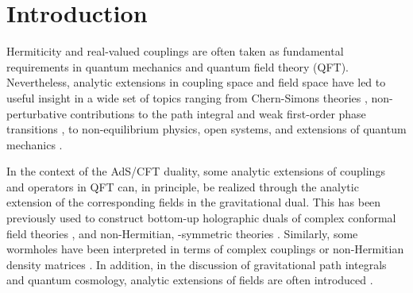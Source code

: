 \section{Introduction}

Hermiticity and real-valued couplings are often taken as fundamental requirements in quantum mechanics and quantum field theory (QFT). 
Nevertheless, analytic extensions in coupling space and field space have led to useful insight in a wide set of topics ranging from Chern-Simons theories \cite{Witten:2010cx}, non-perturbative contributions to the path integral \cite{Basar:2013eka} and weak first-order phase transitions \cite{Gorbenko:2018dtm,Gorbenko:2018ncu}, to non-equilibrium physics, open systems, and extensions of quantum mechanics \cite{Mostafazadeh:2008pw,Ashida:2020dkc,Bender:2023cem}.

In the context of the AdS/CFT duality, some analytic extensions of couplings and operators in QFT can, in principle, be realized through the analytic extension of the corresponding fields in the gravitational dual.
This has been previously used to construct bottom-up holographic duals of complex conformal field theories \cite{Faedo:2019nxw,Faedo:2021ksi}, and non-Hermitian, \PT-symmetric theories \cite{Arean:2019pom,Morales-Tejera:2022hyq,Xian:2023zgu,Arean:2024gks,Arean:2024lzz}. 
Similarly, some wormholes have been interpreted in terms of complex couplings or non-Hermitian density matrices \cite{Maldacena:2018lmt,Loges:2022nuw,Garcia-Garcia:2020ttf,Garcia-Garcia:2022zmo,Harper:2025lav,Kawamoto:2025oko,Held:2026bbo}.
In addition, in the discussion of gravitational path integrals and quantum cosmology, analytic extensions of fields are often introduced \cite{Gibbons:1978ac,Halliwell:1989dy,Louko:1995jw}.

